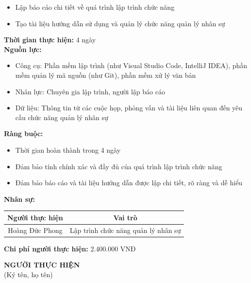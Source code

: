 {\begin{minipage}{\textwidth}
\begin{itemize}
        \item Lập báo cáo chi tiết về quá trình lập trình chức năng
        \item Tạo tài liệu hướng dẫn sử dụng và quản lý chức năng quản lý nhân sự
    \end{itemize}
    \vspace{0.5cm}
    \noindent \textbf{Thời gian thực hiện:} 4 ngày \\
    \noindent \textbf{Nguồn lực:}
    \begin{itemize}
        \item Công cụ: Phần mềm lập trình (như Visual Studio Code, IntelliJ IDEA), phần mềm quản lý mã nguồn (như Git), phần mềm xử lý văn bản
        \item Nhân lực: Chuyên gia lập trình, người lập báo cáo
        \item Dữ liệu: Thông tin từ các cuộc họp, phỏng vấn và tài liệu liên quan đến yêu cầu chức năng quản lý nhân sự
    \end{itemize}
    \vspace{0.5cm}
    \noindent \textbf{Ràng buộc:}
    \begin{itemize}
        \item Thời gian hoàn thành trong 4 ngày
        \item Đảm bảo tính chính xác và đầy đủ của quá trình lập trình chức năng
        \item Đảm bảo báo cáo và tài liệu hướng dẫn được lập chi tiết, rõ ràng và dễ hiểu
    \end{itemize}
    \vspace{0.5cm}
    \noindent \textbf{Nhân sự:}
    \begin{longtable}{|c|c|}
    \hline
    \textbf{Người thực hiện} & \textbf{Vai trò} \\
    \hline
    Hoàng Đức Phong & Lập trình chức năng quản lý nhân sự \\
    \hline
    \end{longtable}
    \vspace{0.5cm}
    \noindent \textbf{Chi phí người thực hiện:} 2.400.000 VNĐ \\
    \vspace{1cm}
    \begin{flushleft}
        \hspace{8cm} \textbf{NGƯỜI THỰC HIỆN} \\
        \hspace{8.8cm} (Ký tên, họ tên) \\
        \vspace{1cm}
    \end{flushleft}
    \end{minipage}
}
% 
